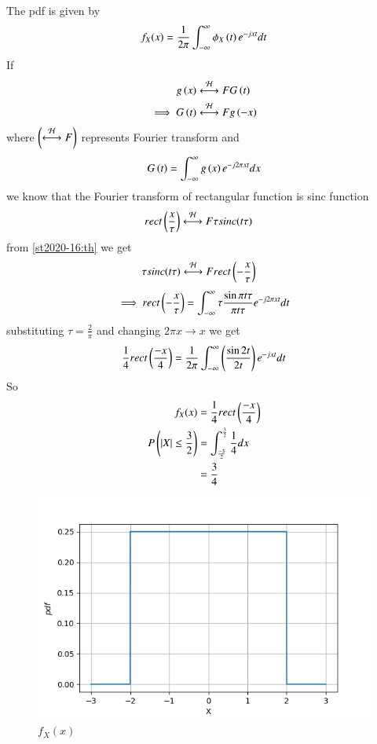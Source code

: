 
The pdf is given by
\begin{align}
    f_{X}(x) = \frac{1}{2\pi} \int_{-\infty}^{\infty}  \phi_{X}\left(t\right)e^{-jxt} dt 
\end{align}
If
\begin{align}
    g\brak{x} &\system{F} G\brak{t}\\
    \implies G\brak{t} &\system{F} g\brak{-x} \label{st2020-16:th}
\end{align}
where $ \left(\overset{\mathcal{H}}{ \longleftrightarrow}{F}\right)$ represents Fourier transform and
\begin{align}
    G\left(t\right)  = \int_{-\infty}^{\infty} g\left(x\right) e^{-j2\pi xt} dx 
\end{align}
we know that the Fourier transform of rectangular function is sinc function
\begin{align}
    rect\left(\frac{x}{\tau}\right) &\overset{\mathcal{H}}{ \longleftrightarrow}{F} \tau sinc(t\tau)
\end{align}
from \eqref{st2020-16:th} we get
\begin{align}
  \tau sinc(t\tau) &\overset{\mathcal{H}}{ \longleftrightarrow}{F} rect\left(-\frac{x}{\tau}\right)
\end{align}
\begin{align}
 \implies rect\left(-\frac{x}{\tau}\right) = \int_{-\infty}^{\infty} \tau \frac{\sin{\pi t \tau}}{{\pi t \tau}} e^{-j2\pi xt}dt
\end{align}
substituting $\tau = \frac{2}{\pi}$ and changing $2\pi x \rightarrow x $ we get
\begin{align}
    \frac{1}{4}rect\left(\frac{-x}{4}\right) = \frac{1}{2\pi} \int_{-\infty}^{\infty} \left(\frac{\sin{2t}}{2t}\right)e^{-jxt} dt 
\end{align}
So
\begin{align}
    f_{X}(x) &= \frac{1}{4}rect\left(\frac{-x}{4}\right)\\
    P\left(|X|\leq \frac{3}{2}\right) &= \int_{\frac{-3}{2}}^{\frac{3}{2}} \frac{1}{4} dx\\
    &=\frac{3}{4}
\end{align}
\begin{figure}[!ht]
\centering
\includegraphics[width=\columnwidth]{solutions/adv/st/2020/16/figs/Assignment5.png}
\caption{$f_{X}(x)$}
\label{st2020-16:pdf}
\end{figure}


